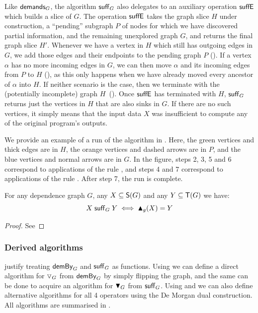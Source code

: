 Like $\mathrel{\textup{\textsf{demands}}_{G}}$, the algorithm $\mathrel{\textup{\textsf{suff}}_{G}}$ also delegates to an auxiliary operation $\mathrel{\textup{\textsf{suffE}}_{}}$
which builds a slice of $G$. The operation $\mathrel{\textup{\textsf{suffE}}_{}}$ takes the graph slice $H$ under construction, a
``pending'' subgraph $P$ of nodes for which we have discovered partial information, and the remaining
unexplored graph $G$, and returns the final graph slice $H'$. Whenever we have a vertex in $H$ which still has
outgoing edges in $G$, we add those edges and their endpoints to the pending graph $P$ ().
If a vertex $\alpha$ has no more incoming edges in $G$, we can then move $\alpha$ and its incoming edges from
$P$ to $H$ (), as this only happens when we have already moved every ancestor of $\alpha$
into $H$. If neither scenario is the case, then we terminate with the (potentially incomplete) graph
$H$~(). Once $\mathrel{\textup{\textsf{suffE}}_{}}$ has terminated with $H$, $\mathrel{\textup{\textsf{suff}}_{G}}$ returns just the
vertices in $H$ that are also sinks in $G$. If there are no such vertices, it simply means that the input data
$X$ was insufficient to compute any of the original program's outputs.

We provide an example of a run of the algorithm in . Here,
the green vertices and thick edges are in $H$, the orange vertices and dashed arrows are in $P$, and the
blue vertices and normal arrows are in $G$. In the figure, steps 2, 3, 5 and 6 correspond to applications
of the rule , and steps 4 and 7 correspond to applications of the rule .
After step 7, the run is complete.



\begin{proposition}
   \label{prop:sufficesAlg-computes-suffices}
   For any dependence graph $G$, any $X \subseteq \mathsf{S}(G)$ and any $Y \subseteq \mathsf{T}(G)$ we have:
   \[X \mathrel{\textup{\textsf{suff}}_{G}} Y \iff \blacktriangle_{g}(X) = Y\]
\end{proposition}
\begin{proof}
   See 
\end{proof}

\subsubsection{Derived algorithms}

 justify treating
$\mathrel{\textup{\textsf{demBy}}_{G}}$ and $\mathrel{\textup{\textsf{suff}}_{G}}$ as functions. Using  we can
define a direct algorithm for $\triangledown_{G}$ from $\mathrel{\textup{\textsf{demBy}}_{G}}$ by simply flipping the graph, and the
same can be done to acquire an algorithm for $\blacktriangledown_{G}$ from $\mathrel{\textup{\textsf{suff}}_{G}}$. Using
 and  we can also define alternative
algorithms for all 4 operators using the De Morgan dual construction. All algorithms are summarised in
.

